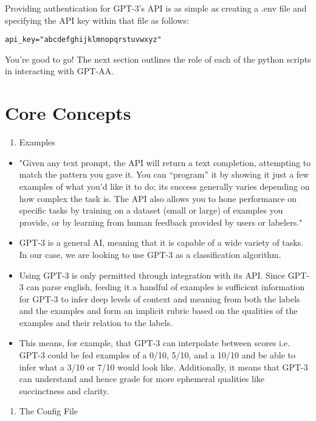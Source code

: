 \documentclass[
]{article}
\providecommand{\tightlist}{%
  \setlength{\itemsep}{0pt}\setlength{\parskip}{0pt}}
\begin{document}
Providing authentication for GPT-3's API is as simple as creating a .env
file and specifying the API key within that file as follows:

\texttt{api\_key="abcdefghijklmnopqrstuvwxyz"}

You're good to go! The next section outlines the role of each of the
python scripts in interacting with GPT-AA.

\hypertarget{core-concepts}{%
\section{Core Concepts}\label{core-concepts}}

\begin{enumerate}
\def\labelenumi{\arabic{enumi}.}
\tightlist
\item
  Examples
\end{enumerate}

\begin{itemize}
\item
  "Given any text prompt, the API will return a text completion,
  attempting to match the pattern you gave it. You can ``program'' it by
  showing it just a few examples of what you'd like it to do; its
  success generally varies depending on how complex the task is. The API
  also allows you to hone performance on specific tasks by training on a
  dataset (small or large) of examples you provide, or by learning from
  human feedback provided by users or labelers."
\item
  GPT-3 is a general AI, meaning that it is capable of a wide variety of
  tasks. In our case, we are looking to use GPT-3 as a classification
  algorithm.
\item
  Using GPT-3 is only permitted through integration with its API. Since
  GPT-3 can parse english, feeding it a handful of examples is
  sufficient information for GPT-3 to infer deep levels of context and
  meaning from both the labels and the examples and form an implicit
  rubric based on the qualities of the examples and their relation to
  the labels.
\item
  This means, for example, that GPT-3 can interpolate between scores
  i.e. GPT-3 could be fed examples of a 0/10, 5/10, and a 10/10 and be
  able to infer what a 3/10 or 7/10 would look like. Additionally, it
  means that GPT-3 can understand and hence grade for more ephemeral
  qualities like succinctness and clarity.
\end{itemize}

\begin{enumerate}
\def\labelenumi{\arabic{enumi}.}
\setcounter{enumi}{1}
\itemsep1pt\parskip0pt
\item
  The Config File
\end{enumerate}
\end{document}
